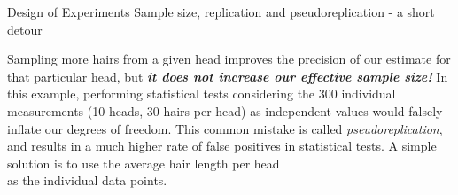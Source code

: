 \documentclass[t]{beamer}
\begin{document}
\begin{ftst}
{Design of Experiments}
{Sample size, replication and pseudoreplication - a short detour}
Sampling more hairs from a given head improves the precision of our estimate for that particular head, but \textit{\textbf{it does not increase our effective sample size!}}
\vone
In this example, performing statistical tests considering the 300 individual measurements (10 heads, 30 hairs per head) as independent values would falsely inflate our degrees of freedom.
\vone
This common mistake is called \textit{pseudoreplication}, and results in a much higher rate of false positives in statistical tests.
\vone
A simple solution is to use the average hair length per head\\
as the individual data points.
\end{ftst}

\end{document}
